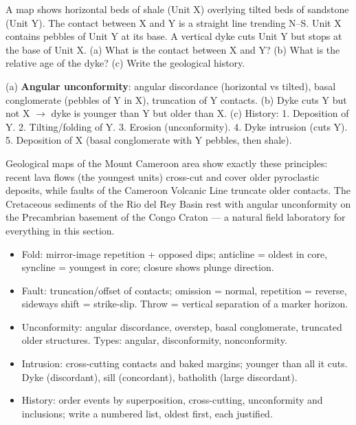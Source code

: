 \documentclass[11pt]{article}
\begin{document}
\begin{exercice}
A map shows horizontal beds of shale (Unit X) overlying tilted beds of sandstone (Unit Y). The contact between X and Y is a straight line trending N--S. Unit X contains pebbles of Unit Y at its base. A vertical dyke cuts Unit Y but stops at the base of Unit X. (a) What is the contact between X and Y? (b) What is the relative age of the dyke? (c) Write the geological history.
\end{exercice}

\begin{corrige}[Exercise 2]
(a) \textbf{Angular unconformity}: angular discordance (horizontal vs tilted), basal conglomerate (pebbles of Y in X), truncation of Y contacts. (b) Dyke cuts Y but not X $\rightarrow$ dyke is younger than Y but older than X. (c) History: 1. Deposition of Y. 2. Tilting/folding of Y. 3. Erosion (unconformity). 4. Dyke intrusion (cuts Y). 5. Deposition of X (basal conglomerate with Y pebbles, then shale).
\end{corrige}

\begin{savaistu}
Geological maps of the Mount Cameroon area show exactly these principles: recent lava flows (the youngest units) cross-cut and cover older pyroclastic deposits, while faults of the Cameroon Volcanic Line truncate older contacts. The Cretaceous sediments of the Rio del Rey Basin rest with angular unconformity on the Precambrian basement of the Congo Craton — a natural field laboratory for everything in this section.
\end{savaistu}

\begin{aretenir}
\begin{itemize}
\item Fold: mirror-image repetition + opposed dips; anticline = oldest in core, syncline = youngest in core; closure shows plunge direction.
\item Fault: truncation/offset of contacts; omission = normal, repetition = reverse, sideways shift = strike-slip. Throw = vertical separation of a marker horizon.
\item Unconformity: angular discordance, overstep, basal conglomerate, truncated older structures. Types: angular, disconformity, nonconformity.
\item Intrusion: cross-cutting contacts and baked margins; younger than all it cuts. Dyke (discordant), sill (concordant), batholith (large discordant).
\item History: order events by superposition, cross-cutting, unconformity and inclusions; write a numbered list, oldest first, each justified.
\end{itemize}
\end{aretenir}
\end{document}
